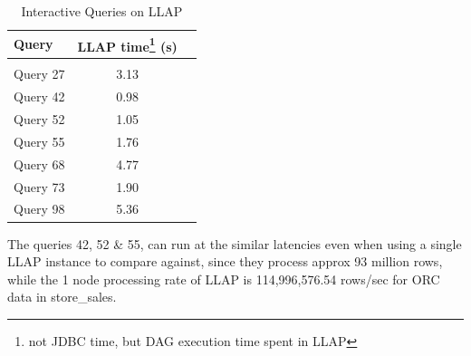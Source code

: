 \begin{table}[h]
\begin{tabular}{l|*{1}cr}
Query & LLAP time\footnote{not JDBC time, but DAG execution time spent in LLAP} (s)\\
\hline \\
Query 27 & 3.13  \\
Query 42 & 0.98  \\
Query 52 & 1.05  \\
Query 55 & 1.76  \\
Query 68 & 4.77  \\
Query 73 & 1.90  \\
Query 98 & 5.36  \\
\end{tabular}
\caption{Interactive Queries on LLAP}
\end{table}

The queries 42, 52 \& 55, can run at the similar latencies even when using a single LLAP instance to compare against, since they process approx
93 million  rows, while the 1 node processing rate of LLAP is 114,996,576.54 rows/sec for ORC data in store\_sales. 
